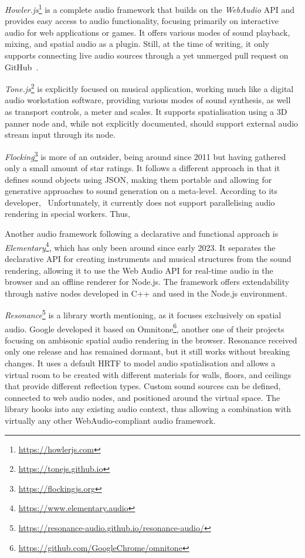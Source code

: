 

\emph{Howler.js}\footnote{\url{https://howlerjs.com}} is a complete audio framework that builds on the \emph{WebAudio} \ac{API} and provides easy access to audio functionality, focusing primarily on interactive audio for web applications or games.
It offers various modes of sound playback, mixing, and spatial audio as a plugin.
Still, at the time of writing, it only supports connecting live audio sources through a yet unmerged pull request on GitHub~\parencite{githubHowlerPullRequest}.

\emph{Tone.js}\footnote{\url{https://tonejs.github.io}} is explicitly focused on musical application, working much like a digital audio workstation software, providing various modes of sound synthesis, as well as transport controls, a meter and scales.
It supports spatialisation using a \ac{3D} panner node and, while not explicitly documented, should support external audio stream input through its  node.

\emph{Flocking}\footnote{\url{https://flockingjs.org}} is more of an outsider, being around since 2011 but having gathered only a small amount of star ratings.
It follows a different approach in that it defines sound objects using \ac{JSON}, making them portable and allowing for generative approaches to sound generation on a meta-level.
According to its developer,~ Unfortunately, it currently does not support parallelising audio rendering in special workers.
Thus,~

Another audio framework following a declarative and functional approach is \emph{Elementary}\footnote{\url{https://www.elementary.audio}}, which has only been around since early 2023.
It separates the declarative \ac{API} for creating instruments and musical structures from the sound rendering, allowing it to use the Web Audio \ac{API} for real-time audio in the browser and an offline renderer for Node.js.
The framework offers extendability through native nodes developed in C++ and used in the Node.js environment.

\emph{Resonance}\footnote{\url{https://resonance-audio.github.io/resonance-audio/}} is a library worth mentioning, as it focuses exclusively on spatial audio.
Google developed it based on Omnitone\footnote{\url{https://github.com/GoogleChrome/omnitone}}, another one of their projects focusing on ambisonic spatial audio rendering in the browser.
Resonance received only one release and has remained dormant, but it still works without breaking changes.
It uses a default \ac{HRTF} to model audio spatialisation and allows a virtual room to be created with different materials for walls, floors, and ceilings that provide different reflection types.
Custom sound sources can be defined, connected to web audio nodes, and positioned around the virtual space.
The library hooks into any existing audio context, thus allowing a combination with virtually any other WebAudio-compliant audio framework.

